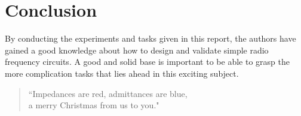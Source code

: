 \documentclass[report.tex]{subfiles}
\begin{document}
\pagebreak \section{Conclusion}
By conducting the experiments and tasks given in this report, the authors have gained a good knowledge about how to design and validate simple radio frequency circuits. A good and solid base is important to be able to grasp the more complication tasks that lies ahead in this exciting subject.

\begin{quote}
``Impedances are red, admittances are blue,\\
a merry Christmas from us to you."
\end{quote}
\end{document}
